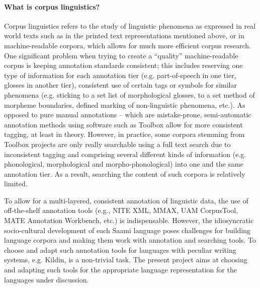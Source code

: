 \documentclass[a4paper,12pt]{article}
\begin{document}
\paragraph{What is corpus linguistics?} Corpus linguistics refers to the study of linguistic phenomena as expressed in real world texts such as in the printed text representations mentioned above, or in machine-readable corpora, which allows for much more efficient corpus research. One significant problem when trying to create a “quality” machine-readable corpus is keeping annotation standards consistent; this includes reserving one type of information for each annotation tier (e.g. part-of-speech in one tier, glosses in another tier), consistent use of certain tags or symbols for similar phenomena (e.g. sticking to a set list of morphological glosses, to a set method of morpheme boundaries, defined marking of non-linguistic phenomena, etc.). As opposed to pure manual annotations – which are mistake-prone, semi-automatic annotation methods using software such as Toolbox allow for more consistent tagging, at least in theory. However, in practice, some corpora stemming from Toolbox projects are only really searchable using a full text search due to inconsistent tagging and comprising several different kinds of information (e.g. phonological, morphological and morpho-phonological) into one and the same annotation tier. As a result, searching the content of such corpora is relatively limited.

To allow for a multi-layered, consistent annotation of linguistic data, the use of off-the-shelf annotation tools (e.g., NITE XML, MMAX, UAM CorpusTool, MATE Annotation Workbench, etc.) is indispensable. However, the idiosyncratic socio-cultural development of each Saami language poses challenges for building language corpora and making them work with annotation and searching tools. To choose and adapt such annotation tools for languages with peculiar writing systems, e.g. Kildin, is a non-trivial task. The present project aims at choosing and adapting such tools for the appropriate language representation for the languages under discussion. %
\end{document}
